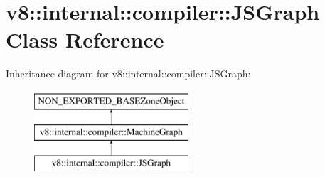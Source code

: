 \hypertarget{classv8_1_1internal_1_1compiler_1_1JSGraph}{}\section{v8\+:\+:internal\+:\+:compiler\+:\+:J\+S\+Graph Class Reference}
\label{classv8_1_1internal_1_1compiler_1_1JSGraph}
Inheritance diagram for v8\+:\+:internal\+:\+:compiler\+:\+:J\+S\+Graph\+:\begin{figure}[H]
\begin{center}
\leavevmode
\includegraphics[height=3.000000cm]{classv8_1_1internal_1_1compiler_1_1JSGraph}
\end{center}
\end{figure}
